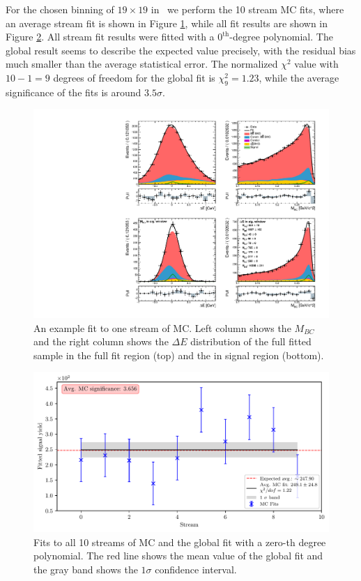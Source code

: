 For the chosen binning of $19 \times 19$ in \vars~we perform the 10 stream MC fits, where an average stream fit is shown in Figure \ref{fig:sig_streamfit}, while all fit results are shown in Figure \ref{fig:sig_global}. All stream fit results were fitted with a $0^{\mathrm{th}}$-degree polynomial. The global result seems to describe the expected value precisely, with the residual bias much smaller than the average statistical error. The normalized $\chi^2$ value with $10-1=9$ degrees of freedom for the global fit is $\chi^2_9 = 1.23$, while the average significance of the fits is around $3.5 \sigma$.

\begin{figure}[H]
	\centering
	\captionsetup{width=0.8\linewidth}
	\includegraphics[width=\linewidth]{fig/sig_fit_mc}
	\caption{An example fit to one stream of MC. Left column shows the $M_{BC}$ and the right column shows the $\Delta E$ distribution of the full fitted sample in the full fit region (top) and the in signal region (bottom).}
	\label{fig:sig_streamfit}
\end{figure}

\begin{figure}[H]
	\centering
	\captionsetup{width=0.8\linewidth}
	\includegraphics[width=\linewidth]{fig/sig_global_mc}
	\caption{Fits to all 10 streams of MC and the global fit with a zero-th degree polynomial. The red line shows the mean value of the global fit and the gray band shows the $1\sigma$ confidence interval.}
	\label{fig:sig_global}
\end{figure}

